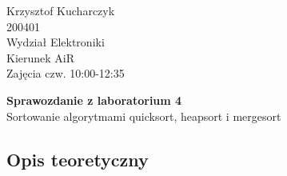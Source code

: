 \documentclass[a4paper,12pt]{report}
\begin{document}
{\raggedleft{}Krzysztof Kucharczyk\\200401\\Wydział Elektroniki\\Kierunek AiR\\Zajęcia czw. 10:00-12:35\\}

\begin{doublespace}
	\begin{center} \textbf{{\large Sprawozdanie z laboratorium 4}}\\
	Sortowanie algorytmami quicksort, heapsort i mergesort	
\end{center}
\end{doublespace}
\subsection{Opis teoretyczny}
 
\end{document}

